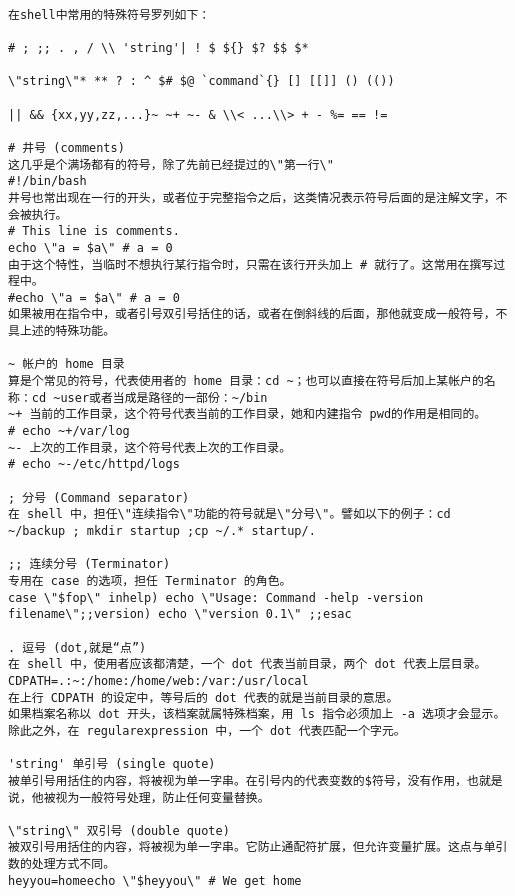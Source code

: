\begin{lstlisting}

在shell中常用的特殊符号罗列如下：

# ; ;; . , / \\ 'string'| ! $ ${} $? $$ $*

\"string\"* ** ? : ^ $# $@ `command`{} [] [[]] () (())

|| && {xx,yy,zz,...}~ ~+ ~- & \\< ...\\> + - %= == !=

# 井号 (comments)
这几乎是个满场都有的符号，除了先前已经提过的\"第一行\"
#!/bin/bash
井号也常出现在一行的开头，或者位于完整指令之后，这类情况表示符号后面的是注解文字，不会被执行。
# This line is comments.
echo \"a = $a\" # a = 0
由于这个特性，当临时不想执行某行指令时，只需在该行开头加上 # 就行了。这常用在撰写过程中。
#echo \"a = $a\" # a = 0
如果被用在指令中，或者引号双引号括住的话，或者在倒斜线的后面，那他就变成一般符号，不具上述的特殊功能。

~ 帐户的 home 目录
算是个常见的符号，代表使用者的 home 目录：cd ~；也可以直接在符号后加上某帐户的名称：cd ~user或者当成是路径的一部份：~/bin
~+ 当前的工作目录，这个符号代表当前的工作目录，她和内建指令 pwd的作用是相同的。
# echo ~+/var/log
~- 上次的工作目录，这个符号代表上次的工作目录。
# echo ~-/etc/httpd/logs

; 分号 (Command separator)
在 shell 中，担任\"连续指令\"功能的符号就是\"分号\"。譬如以下的例子：cd ~/backup ; mkdir startup ;cp ~/.* startup/.

;; 连续分号 (Terminator)
专用在 case 的选项，担任 Terminator 的角色。
case \"$fop\" inhelp) echo \"Usage: Command -help -version filename\";;version) echo \"version 0.1\" ;;esac

. 逗号 (dot,就是“点”)
在 shell 中，使用者应该都清楚，一个 dot 代表当前目录，两个 dot 代表上层目录。
CDPATH=.:~:/home:/home/web:/var:/usr/local
在上行 CDPATH 的设定中，等号后的 dot 代表的就是当前目录的意思。
如果档案名称以 dot 开头，该档案就属特殊档案，用 ls 指令必须加上 -a 选项才会显示。除此之外，在 regularexpression 中，一个 dot 代表匹配一个字元。

'string' 单引号 (single quote)
被单引号用括住的内容，将被视为单一字串。在引号内的代表变数的$符号，没有作用，也就是说，他被视为一般符号处理，防止任何变量替换。

\"string\" 双引号 (double quote)
被双引号用括住的内容，将被视为单一字串。它防止通配符扩展，但允许变量扩展。这点与单引数的处理方式不同。
heyyou=homeecho \"$heyyou\" # We get home


\end{lstlisting}

